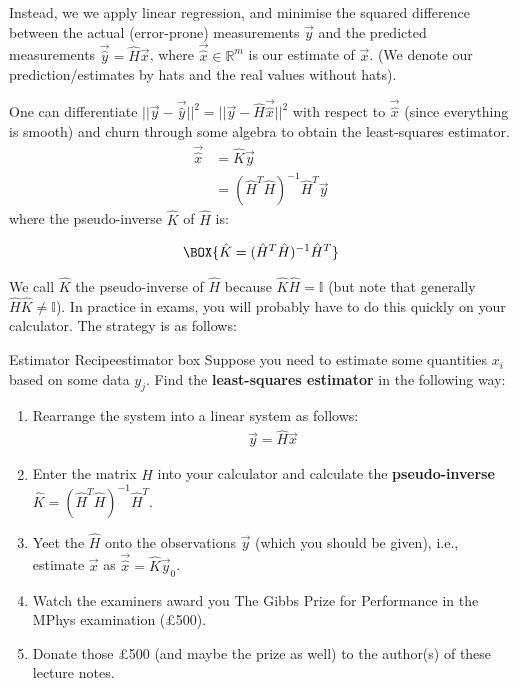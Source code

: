 Instead, we we apply linear regression, and minimise the squared difference between the actual (error-prone) measurements $\vec{y}$ and the predicted measurements $\vec{\hat{y}}=\hat{H}\vec{x}$, where $\vec{\hat{x}}\in\mathbb{R}^m$ is our estimate of $\vec{x}$. (We denote our prediction/estimates by hats and the real values without hats).

One can differentiate $||\vec{y}-\vec{\hat{y}}||^2=||\vec{y}-\hat{H}\vec{\hat{x}}||^2$ with respect to $\vec{\hat{x}}$ (since everything is smooth) and churn through some algebra to obtain the least-squares estimator.
\begin{align}
    \vec{\hat{x}}& =\hat{K}\vec{y} \\
    & = (\hat{H}^T\hat{H})^{-1}\hat{H}^T\vec{y}
\end{align}
where the pseudo-inverse $\hat{K}$ of $\hat{H}$ is:

\begin{align}
    \BOX{\hat{K}= (\hat{H}^T\hat{H})^{-1}\hat{H}^T}
\end{align}

We call $\hat{K}$ the pseudo-inverse of $\hat{H}$ because $\hat{K}\hat{H}=\mathbb{I}$ (but note that generally $\hat{H}\hat{K}\neq\mathbb{I}$). In practice in exams, you will probably have to do this quickly on your calculator. The strategy is as follows: 

\begin{fact}{Estimator Recipe}{estimator box}\label{estimator box}
    Suppose you need to estimate some quantities $x_i$ based on some data $y_j$. Find the \textbf{least-squares estimator} in the following way:
    \begin{enumerate}
        \item Rearrange the system into a linear system as follows:
    \begin{align*}
        \vec{y}=\hat{H}\vec{x}
    \end{align*}
        \item Enter the matrix $\hat{H}$ into your calculator and calculate the \textbf{pseudo-inverse} $\hat{K}= (\hat{H}^T\hat{H})^{-1}\hat{H}^T$. 
        \item Yeet the $\hat{H}$ onto the observations $\vec{y}$ (which you should be given), i.e., estimate $\vec{x}$ as $\vec{\hat{x}}=\hat{K}\vec{y}_0$.
        \item Watch the examiners award you The Gibbs Prize for Performance in the MPhys examination (£500).
        \item Donate those £500 (and maybe the prize as well) to the author(s) of these lecture notes.
    \end{enumerate}
\end{fact}

